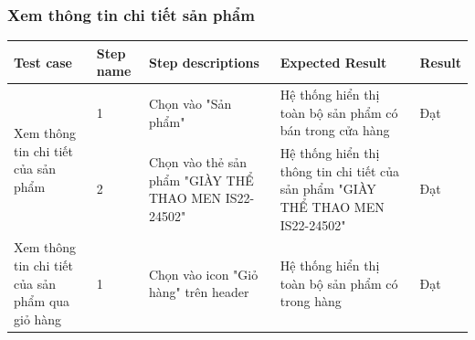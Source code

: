 \subsubsection{Xem thông tin chi tiết sản phẩm}
{
    \setlength\extrarowheight{6pt}
    \begin{longtable}{| p{2.5cm}| p{1cm}| p{5.5cm}| p{4.5cm} | p{1.5cm} |}
        \hline
        \textbf{Test case}                                                                         & \textbf{Step name} & \textbf{Step descriptions} & \textbf{Expected Result} & \textbf{Result} \\
        \hline
        \multirow[t]{2}{2.5cm}{Xem thông tin chi tiết của sản phẩm}                                &
        1                                                                                          &
        Chọn vào "Sản phẩm"                                                                        &
        Hệ thống hiển thị toàn bộ sản phẩm có bán trong cửa hàng                                   &
        Đạt                                                                                                                                                                                       \\
        \cline{2-5}
                                                                                                   & 2                  &
        Chọn vào thẻ sản phẩm "GIÀY THỂ THAO MEN IS22-24502"                                       &
        Hệ thống hiển thị thông tin chi tiết của sản phẩm "GIÀY THỂ THAO MEN IS22-24502"           &
        Đạt                                                                                                                                                                                       \\
        \hline
        \multirow[t]{2}{2.5cm}{Xem thông tin chi tiết của sản phẩm qua giỏ hàng}                   &
        1                                                                                          &
        Chọn vào icon "Giỏ hàng" trên header                                                       &
        Hệ thống hiển thị toàn bộ sản phẩm có trong hàng                                           &
        Đạt                                                                                                                                                                                       \\

\end{longtable}}
